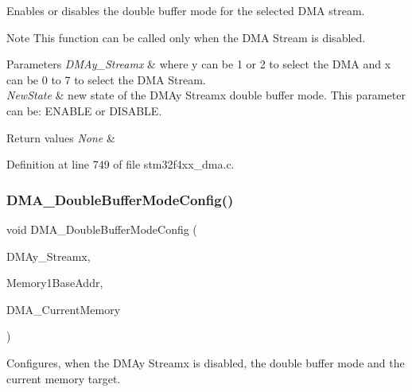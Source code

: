 Enables or disables the double buffer mode for the selected D\+MA stream. 

\begin{DoxyNote}{Note}
This function can be called only when the D\+MA Stream is disabled. 
\end{DoxyNote}

\begin{DoxyParams}{Parameters}
{\em D\+M\+Ay\+\_\+\+Streamx} & where y can be 1 or 2 to select the D\+MA and x can be 0 to 7 to select the D\+MA Stream. \\
\hline
{\em New\+State} & new state of the D\+M\+Ay Streamx double buffer mode. This parameter can be\+: E\+N\+A\+B\+LE or D\+I\+S\+A\+B\+LE. \\
\hline
\end{DoxyParams}

\begin{DoxyRetVals}{Return values}
{\em None} & \\
\hline
\end{DoxyRetVals}


Definition at line 749 of file stm32f4xx\+\_\+dma.\+c.

\mbox{\label{group___d_m_a_ga8d0957e50302efaf48a16c62d14c9ca8}} 
\subsubsection{\texorpdfstring{D\+M\+A\+\_\+\+Double\+Buffer\+Mode\+Config()}{DMA\_DoubleBufferModeConfig()}}
{\footnotesize\ttfamily void D\+M\+A\+\_\+\+Double\+Buffer\+Mode\+Config (\begin{DoxyParamCaption}\item[{\hyperlink{struct_d_m_a___stream___type_def}{D\+M\+A\+\_\+\+Stream\+\_\+\+Type\+Def} $\ast$}]{D\+M\+Ay\+\_\+\+Streamx,  }\item[{uint32\+\_\+t}]{Memory1\+Base\+Addr,  }\item[{uint32\+\_\+t}]{D\+M\+A\+\_\+\+Current\+Memory }\end{DoxyParamCaption})}



Configures, when the D\+M\+Ay Streamx is disabled, the double buffer mode and the current memory target. 


